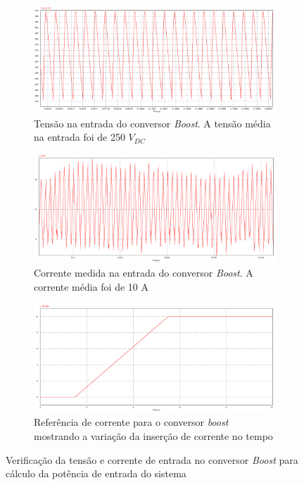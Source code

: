 \begin{figure}[!hbt]
	\centering
	\begin{subfigure}[b]{0.5\textwidth}
		\centering
		\includegraphics[width=\textwidth]{figuras/sim_figures/inversor_e_boost/tensao_entrada_boost_2.PNG}
		\caption{Tensão na entrada do conversor \textit{Boost}. A tensão média na entrada foi de 250 $V_{DC}$}
	\end{subfigure}
	
	\begin{subfigure}[b]{0.5\textwidth}
		\centering
		\includegraphics[width=\textwidth]{figuras/sim_figures/inversor_e_boost/corrente_entrada_boost.PNG}
		\caption{Corrente medida na entrada do conversor \textit{Boost}. A corrente média foi de 10 A}
	\end{subfigure}

	\begin{subfigure}[b]{0.5\textwidth}
		\centering
		\includegraphics[width=\textwidth]{figuras/sim_figures/inversor_e_boost/corrente_referencia_boost.PNG}
		\caption{Referência de corrente para o conversor \textit{boost} mostrando a variação da inserção de corrente no tempo}
	\end{subfigure}

	\caption{Verificação da tensão e corrente de entrada no conversor \textit{Boost} para cálculo da potência de entrada do sistema}
    \label{fig:sim-tensao-corrente-boost}
\end{figure}

